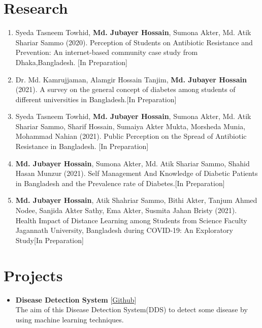 \documentclass[11pt,a4paper]{moderncv}
\begin{document}
\section{Research}
\begin{enumerate}
	\item Syeda Tasneem Towhid, \textbf{Md. Jubayer Hossain}, Sumona Akter, Md. 
	Atik Shariar Sammo (2020). Perception of Students on Antibiotic Resistance 
	and Prevention: An internet-based community case study from 
	Dhaka,Bangladesh. \hfill [In Preparation]
	\item Dr. Md. Kamrujjaman, Alamgir Hossain Tanjim, \textbf{Md. Jubayer 
	Hossain} (2021). A survey on the general concept of diabetes among students 
	of different universities in Bangladesh.\hfill [In Preparation]
	\item Syeda Tasneem Towhid, \textbf{Md. Jubayer Hossain}, Sumona Akter, Md. 
	Atik Shariar Sammo, Sharif Hossain, Sumaiya Akter Mukta, Morsheda Munia, 
	Mohammad Nahian (2021). Public Perception on the Spread of Antibiotic 
	Resistance in Bangladesh. \hfill [In Preparation]
	\item\textbf{ Md. Jubayer Hossain}, Sumona Akter, Md. Atik Shariar Sammo, 
	Shahid Hasan Munzur (2021). Self Management And Knowledge of Diabetic 
	Patients in Bangladesh and the Prevalence rate of Diabetes.\hfill [In 
	Preparation]
	\item \textbf{Md. Jubayer Hossain}, Atik Shahriar Sammo, Bithi Akter, 
	Tanjum Ahmed Nodee, Sanjida Akter Sathy, Ema Akter, Susmita Jahan Bristy 
	(2021). Health Impact of Distance Learning among Students from Science 
	Faculty Jagannath University, Bangladesh  during COVID-19: An Exploratory 
	Study\hfill [In Preparation]

\end{enumerate}

\section{Projects}
\begin{itemize}	
	\item\textbf{Disease Detection System} 
	\hfill [\href{https://github.com/hdrobd/DDS}{Github}]\\
	The aim of this Disease Detection System(DDS) to detect some disease by 
	using machine learning techniques.
\end{itemize}
\end{document}

